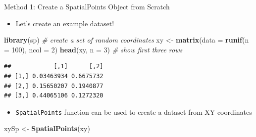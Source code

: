 \documentclass[10pt,ignorenonframetext,]{beamer}
\newenvironment{Shaded}{\begin{snugshade}}{\end{snugshade}}
\newcommand{\KeywordTok}[1]{\textcolor[rgb]{0.13,0.29,0.53}{\textbf{{#1}}}}
\newcommand{\DataTypeTok}[1]{\textcolor[rgb]{0.13,0.29,0.53}{{#1}}}
\newcommand{\DecValTok}[1]{\textcolor[rgb]{0.00,0.00,0.81}{{#1}}}
\newcommand{\StringTok}[1]{\textcolor[rgb]{0.31,0.60,0.02}{{#1}}}
\newcommand{\CommentTok}[1]{\textcolor[rgb]{0.56,0.35,0.01}{\textit{{#1}}}}
\newcommand{\NormalTok}[1]{{#1}}
\providecommand{\tightlist}{%
  \setlength{\itemsep}{0pt}\setlength{\parskip}{0pt}}
\begin{document}
\begin{frame}[fragile]{Method 1: Create a SpatialPoints Object from
Scratch}

\begin{itemize}
\tightlist
\item
  Let's create an example dataset!
\end{itemize}

\begin{Shaded}
\begin{Highlighting}[]
\KeywordTok{library}\NormalTok{(sp)}
\CommentTok{# create a set of random coordinates}
\NormalTok{xy <-}\StringTok{ }\KeywordTok{matrix}\NormalTok{(}\DataTypeTok{data =} \KeywordTok{runif}\NormalTok{(}\DataTypeTok{n =} \DecValTok{100}\NormalTok{), }\DataTypeTok{ncol =} \DecValTok{2}\NormalTok{)}
\KeywordTok{head}\NormalTok{(xy, }\DataTypeTok{n =} \DecValTok{3}\NormalTok{)  }\CommentTok{# show first three rows}
\end{Highlighting}
\end{Shaded}

\begin{verbatim}
##            [,1]      [,2]
## [1,] 0.03463934 0.6675732
## [2,] 0.15650207 0.1940877
## [3,] 0.44065106 0.1272320
\end{verbatim}

\begin{itemize}
\tightlist
\item
  \texttt{SpatialPoints} function can be used to create a dataset from
  XY coordinates
\end{itemize}

\begin{Shaded}
\begin{Highlighting}[]
\NormalTok{xySp <-}\StringTok{ }\KeywordTok{SpatialPoints}\NormalTok{(xy)}
\end{Highlighting}
\end{Shaded}

\end{frame}
\end{document}
